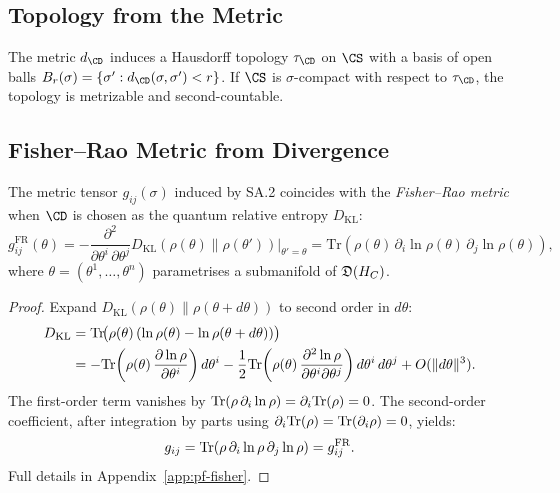\subsection{Topology from the Metric}

\begin{corollary}\label{cor:14.1}
The metric $d_{\CD}$ induces a Hausdorff topology $\tau_{\CD}$ on
$\CS$ with a basis of open balls
$B_r(\sigma) = \{\sigma' : d_{\CD}(\sigma, \sigma') < r\}$.
If $\CS$ is $\sigma$-compact with respect to $\tau_{\CD}$, the
topology is metrizable and second-countable.
\end{corollary}

\subsection{Fisher--Rao Metric from Divergence}

\begin{theorem}\label{thm:14.2}
The metric tensor $g_{ij}(\sigma)$ induced by SA.2 coincides with the
\emph{Fisher--Rao metric} when $\CD$ is chosen as the quantum relative
entropy $D_{\mathrm{KL}}$:
\begin{equation}\label{eq:fisher-metric}
  g_{ij}^{\mathrm{FR}}(\theta)
  = -\frac{\partial^2}{\partial\theta^i\,\partial\theta^j}
    D_{\mathrm{KL}}(\rho(\theta) \| \rho(\theta'))
    \bigg|_{\theta' = \theta}
  = \mathrm{Tr}\!\left(
    \rho(\theta)\,\partial_i \ln\rho(\theta)\,
    \partial_j \ln\rho(\theta)
  \right),
\end{equation}
where $\theta = (\theta^1, \ldots, \theta^n)$ parametrises a submanifold
of $\mathfrak{D}(H_C)$.
\end{theorem}

\begin{proof}
Expand $D_{\mathrm{KL}}(\rho(\theta) \| \rho(\theta + d\theta))$ to
second order in $d\theta$:
\begin{align*}
  D_{\mathrm{KL}} &= \mathrm{Tr}\!\big(\rho(\theta)\,
    (\ln\rho(\theta) - \ln\rho(\theta + d\theta))\big) \\
  &= -\mathrm{Tr}\!\left(\rho(\theta)\,
    \frac{\partial \ln\rho}{\partial\theta^i}\right)d\theta^i
  - \frac{1}{2}\mathrm{Tr}\!\left(\rho(\theta)\,
    \frac{\partial^2 \ln\rho}{\partial\theta^i\partial\theta^j}\right)
    d\theta^i\,d\theta^j + O(\|d\theta\|^3).
\end{align*}
The first-order term vanishes by $\mathrm{Tr}(\rho\,\partial_i \ln\rho) =
\partial_i\mathrm{Tr}(\rho) = 0$.  The second-order coefficient, after
integration by parts using
$\partial_i\mathrm{Tr}(\rho) = \mathrm{Tr}(\partial_i\rho) = 0$, yields:
\[
  g_{ij} = \mathrm{Tr}(\rho\,\partial_i\ln\rho\,\partial_j\ln\rho)
  = g_{ij}^{\mathrm{FR}}.
\]
Full details in Appendix~\ref{app:pf-fisher}.
\end{proof}

